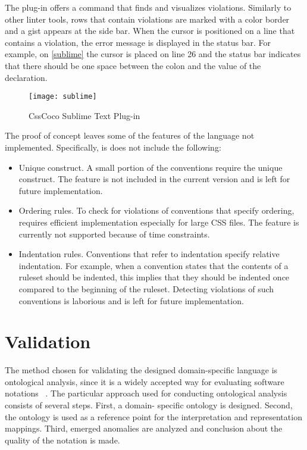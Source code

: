 The plug-in offers a command that finds and visualizes violations. Similarly to
other linter tools, rows that contain violations are marked with a color
border and a gist appears at the side bar. When the cursor is positioned on a
line that contains a violation, the error message is displayed in the status
bar. For example, on \autoref{sublime} the cursor is placed on line 26 and the
status bar indicates that there should be one space between the colon and the
value of the declaration.

\begin{figure}[h!]
  \centering
  \caption{
    \label{sublime}
    CssCoco Sublime Text Plug-in}
  \texttt{[image: sublime]}
\end{figure}

The proof of concept leaves some of the features of the language not implemented. Specifically, is does not include the following:

\begin{itemize}

\item Unique construct. A small portion of the conventions require the unique construct. The feature is not included in the current version and is left for future implementation.

\item Ordering rules. To check for violations of conventions that specify ordering, requires efficient implementation especially for large CSS files. The feature is currently not supported because of time constraints. 

\item Indentation rules. Conventions that refer to indentation specify relative indentation. For example, when a convention states that the contents of a ruleset should be indented, this implies that they should be indented once compared to the beginning of the ruleset. Detecting violations of such conventions is laborious and is left for future implementation.


\end{itemize}

\section{Validation}

The method chosen for validating the designed domain-specific language is
ontological analysis, since it is a widely accepted way for evaluating
software notations ~\cite{opdahl2002ontological,green2000integrated,moody2009physics,parsons1997using,weber1996analytical}. The particular approach used for
conducting ontological analysis consists of several steps. First, a domain-
specific ontology is designed. Second, the ontology is used as a reference
point for the interpretation and representation mappings. Third, emerged
anomalies are analyzed and conclusion about the quality of the notation is
made.

